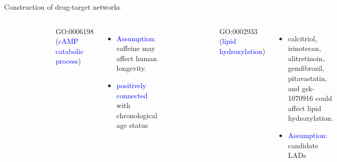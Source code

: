 \documentclass[10pt]{beamer}
\begin{document}
\begin{frame}{Construction of drug-target networks}
\vspace{-0.5cm}
\begin{columns}
\footnotesize
{}
    \begin{figure}[t]
        \begin{flushleft}
        \includegraphics[width=3.2cm]{demo/images/dtnet_camp.png}
        \end{flushleft}
    \end{figure}
    
    GO:0006198 (\textcolor{blue}{cAMP catabolic process})
    \begin{itemize}
        \item \textcolor{blue}{Assumption:} caffeine may affect human longevity.
        \item \textcolor{blue}{positively connected} with chronological age status
    \end{itemize}
    
\vspace{0.2cm}
    \begin{figure}[t]
        \begin{flushleft}
        \includegraphics[width=3.8cm]{demo/images/dtnet_hydroxy.png}
        \end{flushleft}
    \end{figure}
    \vspace{0.3cm}
    GO:0002933 (\textcolor{blue}{lipid hydroxylation})
    \begin{itemize}
        \item calcitriol, irinotecan, alitretinoin, gemfibrozil, pitavastatin, and gsk-1070916 could affect lipid hydroxylation. 
        \item \textcolor{blue}{Assumption:} candidate LADs
    \end{itemize}
    \vspace{-0.9cm}
        \begin{figure}[t]
            \begin{flushleft}
                \includegraphics[width=2.8cm]{demo/images/dtnet_remodel.png}
            \end{flushleft}
        \end{figure}


\end{columns}
\end{frame}
\end{document}
